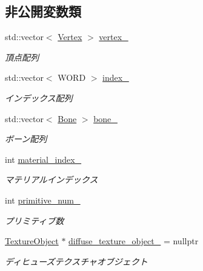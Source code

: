 \subsection*{非公開変数類}
\begin{DoxyCompactItemize}
\item 
std\+::vector$<$ \mbox{\hyperlink{struct_md_bin_object_1_1_vertex}{Vertex}} $>$ \mbox{\hyperlink{class_md_bin_object_1_1_mesh_a5b9315e10ec54e41c6f34a2356cae921}{vertex\+\_\+}}
\begin{DoxyCompactList}\small\item\em 頂点配列 \end{DoxyCompactList}\item 
std\+::vector$<$ W\+O\+RD $>$ \mbox{\hyperlink{class_md_bin_object_1_1_mesh_aa43653580fee9b2de544d11f48a8cde3}{index\+\_\+}}
\begin{DoxyCompactList}\small\item\em インデックス配列 \end{DoxyCompactList}\item 
std\+::vector$<$ \mbox{\hyperlink{class_md_bin_object_1_1_bone}{Bone}} $>$ \mbox{\hyperlink{class_md_bin_object_1_1_mesh_a709eebcf7b3c24d195b95a90b9aabf5d}{bone\+\_\+}}
\begin{DoxyCompactList}\small\item\em ボーン配列 \end{DoxyCompactList}\item 
int \mbox{\hyperlink{class_md_bin_object_1_1_mesh_a1d91456b2bf86cefaccb98721e641b1e}{material\+\_\+index\+\_\+}}
\begin{DoxyCompactList}\small\item\em マテリアルインデックス \end{DoxyCompactList}\item 
int \mbox{\hyperlink{class_md_bin_object_1_1_mesh_a435bc1e0493b6a3494febb5085fa226b}{primitive\+\_\+num\+\_\+}}
\begin{DoxyCompactList}\small\item\em プリミティブ数 \end{DoxyCompactList}\item 
\mbox{\hyperlink{class_texture_object}{Texture\+Object}} $\ast$ \mbox{\hyperlink{class_md_bin_object_1_1_mesh_aa8733b094fb461d76af9a2f014fc66aa}{diffuse\+\_\+texture\+\_\+object\+\_\+}} = nullptr
\begin{DoxyCompactList}\small\item\em ディヒューズテクスチャオブジェクト \end{DoxyCompactList}\item 

\end{DoxyCompactItemize}
